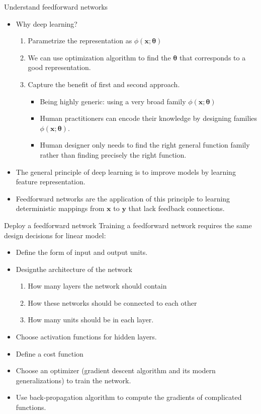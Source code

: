 \documentclass[10pt]{beamer}
\begin{document}
	\begin{frame}{Understand feedforward networks}
		\begin{itemize}
			\item Why deep learning?
			\begin{enumerate}
				\item Parametrize the representation as $\phi(\bm{x};\bm{\theta})$
				\item We can use optimization algorithm to find the $\bm{\theta}$ that corresponds to a good representation.
				\item Capture the benefit of first and second approach.
				\begin{itemize}
					\item Being highly generic: using a very broad family $\phi(\bm{x};\bm{\theta})$
					\item Human practitioners can encode their knowledge by designing families $\phi(\bm{x};\bm{\theta})$.
					\item Human designer only needs to find the right general function family rather than finding precisely the right function.
				\end{itemize}
			\end{enumerate}
			\item The general principle of deep learning is to improve models by learning feature representation.
			\item Feedforward networks are the application of this principle to learning deterministic mappings from $\bm{x}$ to $\bm{y}$ that lack feedback connections.
		\end{itemize}
	\end{frame}
	
	\begin{frame}{Deploy a feedforward network}
		Training a feedforward network requires the same design decisions for linear model:
		\begin{itemize}
			\item Define the form of input and output units.
			\item Designthe architecture of the network
			\begin{enumerate}
				\item How many layers the network should contain
				\item How these networks should be connected to each other
				\item How many units should be in each layer.
			\end{enumerate}
			\item Choose activation functions for hidden layers.
			\item Define a cost function
			\item Choose an optimizer (gradient descent algorithm and its modern generalizations) to train the network.
			\item Use back-propagation algorithm to compute the gradients of complicated functions.
		\end{itemize}
	\end{frame}
\end{document}

